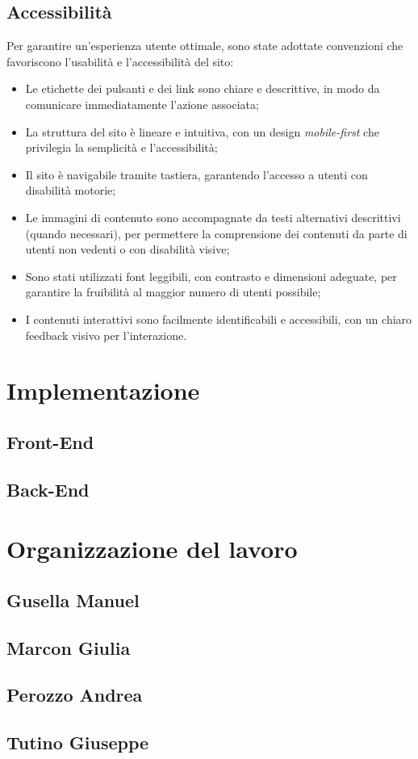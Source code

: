 \documentclass[10pt]{article}
\begin{document}
\subsection{Accessibilità}
Per garantire un'esperienza utente ottimale, sono state adottate convenzioni che favoriscono l'usabilità e l'accessibilità del sito:
\begin{itemize}
\item Le etichette dei pulsanti e dei link sono chiare e descrittive, in modo da comunicare immediatamente l’azione associata;
\item La struttura del sito è lineare e intuitiva, con un design \textit{mobile-first} che privilegia la semplicità e l'accessibilità;
\item Il sito è navigabile tramite tastiera, garantendo l'accesso a utenti con disabilità motorie;
\item Le immagini di contenuto sono accompagnate da testi alternativi descrittivi (quando necessari), per permettere la comprensione dei contenuti da parte di utenti non vedenti o con disabilità visive;
\item Sono stati utilizzati font leggibili, con contrasto e dimensioni adeguate, per garantire la fruibilità al maggior numero di utenti possibile;
\item I contenuti interattivi sono facilmente identificabili e accessibili, con un chiaro feedback visivo per l’interazione.
\end{itemize}

\section{Implementazione}
\subsection{Front-End}
\subsection{Back-End}

\section{Organizzazione del lavoro}
\subsection{Gusella Manuel}
\subsection{Marcon Giulia}
\subsection{Perozzo Andrea}
\subsection{Tutino Giuseppe}
\end{document}
